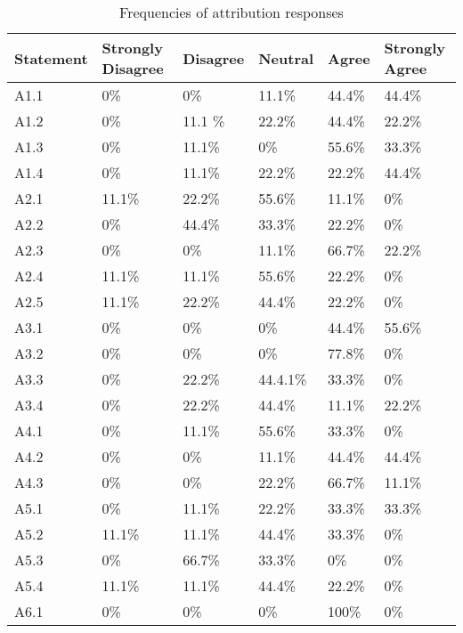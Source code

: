 \begin{longtable}{  p{}   p{}  p{}  p{}  p{}  p{} }
 \caption[Attribution Question Frequencies]{Frequencies of attribution responses} \\
	\bottomrule
    Statement  & Strongly Disagree & Disagree & Neutral & Agree & Strongly Agree \\
	\bottomrule
   A1.1 & 0\% & 0\%  & 11.1\%  &   44.4\%  & 44.4\%
   \\
   A1.2  & 0\% & 11.1 \% & 22.2\% & 44.4\% & 22.2\%
     \\
     A1.3  & 0\% & 11.1\% & 0\% & 55.6\% &  33.3\% 
    \\
     A1.4 & 0\% & 11.1\% & 22.2\% &  22.2\% & 44.4\%
      \\
      \hline
      A2.1  & 11.1\% & 22.2\% & 55.6\% & 11.1\% & 0\%
      \\
      A2.2  & 0\% & 44.4\% & 33.3\% &  22.2\% & 0\%
     \\ 
    A2.3  &  0\% & 0\% & 11.1\% & 66.7\%  &  22.2\%   
    \\ 
    A2.4  &  11.1\% & 11.1\%  & 55.6\%  &   22.2\%  & 0\%  
    \\ 
    A2.5  &  11.1\% & 22.2\%  & 44.4\%  &   22.2\%  & 0\%  
    \\
    \hline
      A3.1 & 0\% & 0\% & 0\% & 44.4\% & 55.6\% 
      \\
      A3.2 & 0\% & 0\% & 0\% &  77.8\% & 0\%
     \\ 
    A3.3 & 0\% & 22.2\% & 44.4.1\% & 33.3\%  &  0\%   
    \\ 
    A3.4 & 0\% & 22.2\%  & 44.4\%  & 11.1\%  & 22.2\% 
    \\
    \hline
      A4.1 & 0\% & 11.1\% & 55.6\% & 33.3\% & 0\% 
      \\
      A4.2 & 0\% & 0\% & 11.1\% &  44.4\% & 44.4\%
     \\ 
    A4.3 & 0\% & 0\% & 22.2\% & 66.7\%  &  11.1\%  
    \\
    \hline
      A5.1 & 0\% & 11.1\% & 22.2\% & 33.3\% & 33.3\% 
      \\
      A5.2 & 11.1\% & 11.1\% & 44.4\% &  33.3\% & 0\%
     \\ 
    A5.3 & 0\% & 66.7\% & 33.3\% & 0\%  &  0\%   
    \\ 
    A5.4 & 11.1\% & 11.1\%  & 44.4\%  & 22.2\%  & 0\% 
    \\
    \hline
      A6.1 & 0\% & 0\% & 0\% & 100\% & 0\% 
      \\

\end{longtable}
